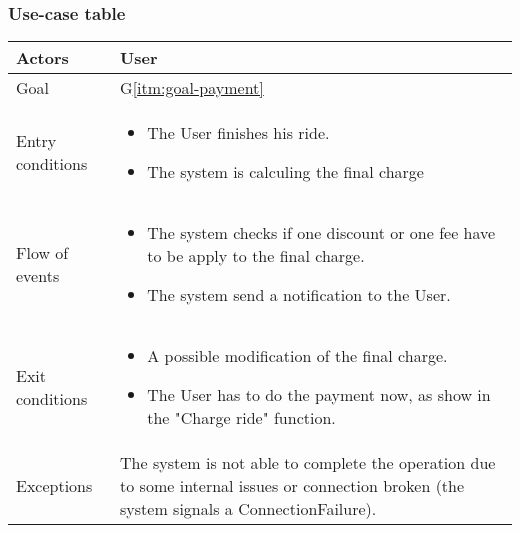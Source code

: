 

\subsubsection{Use-case table}
\begin{center}
  \begin{tabular}{ l | p{10cm} }
    \hline
    Actors & User\\ \hline
    Goal & G\ref{itm:goal-payment}\\ \hline %
    Entry conditions & \begin{itemize}
			\item The User finishes his ride.
			\item The system is calculing the final charge

\end{itemize}  \\ \hline
  Flow of events &
\begin{itemize}
\item The system checks if one discount or one fee have to be apply to the final charge.
\item The system send a notification to the User.
\end{itemize} \\ \hline
    Exit conditions &
\begin{itemize}
	\item A possible modification of the final charge.
  \item The User has to do the payment now, as show in the "Charge ride" function.
\end{itemize}  \\ \hline
  Exceptions & 

The system is not able to complete the operation due to some internal issues or connection broken (the system signals a ConnectionFailure).%
\\ \hline
  \end{tabular}
\end{center}


